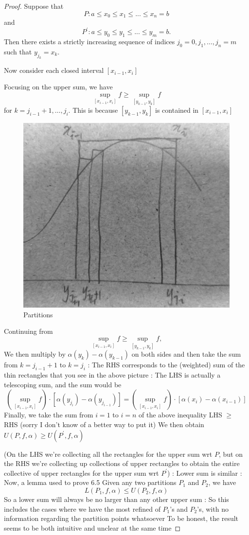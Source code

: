 \begin{proof}
Suppose that
\[ P: a\le x_0\le x_1\le ...\le x_n=b \]
and
\[ P^\prime: a\le y_0\le y_1\le ...\le y_m=b. \]
Then there exists a strictly increasing sequence of indices $j_0=0,j_1,\dots,j_n=m$ such that $y_{j_k}=x_k$.

Now consider each closed interval $[x_{i-1},x_i]$

Focusing on the upper sum, we have
\[ \sup_{[x_{i-1},x_i]} f \ge \sup_{[y_{k-1},y_k]} f \]
for $k=j_{i-1}+1,\dots,j_i$. 
This is because $[y_{k-1},y_k]$ is contained in $[x_{i-1},x_i]$

\begin{figure}[H]
    \centering
    \includegraphics[width=0.5\linewidth]{images/RSintegral-partitions.png}
    \caption{Partitions}
\end{figure}

Continuing from
\[ \sup_{[x_{i-1},x_i]} f \ge \sup_{[y_{k-1},y_k]} f, \]
We then multiply by $\alpha(y_k)-\alpha(y_{k-1})$ on both sides and then take the sum from $k=j_{i-1}+1$ to $k=j_i$
:
The RHS corresponds to the (weighted) sum of the thin rectangles that you see in the above picture
:
The LHS is actually a telescoping sum, and the sum would be
\[ (\sup_{[x_{i-1},x_i]} f) \cdot [\alpha(y_{j_i})-\alpha(y_{j_{i-1}})] = (\sup_{[x_{i-1},x_i]} f) \cdot [\alpha(x_i)-\alpha(x_{i-1})] \]
Finally, we take the sum from $i=1$ to $i=n$ of the above inequality
LHS $\ge$ RHS (sorry I don't know of a better way to put it)
We then obtain $U(P,f,\alpha)\ge U(P^\prime,f,\alpha)$

(On the LHS we're collecting all the rectangles for the upper sum wrt $P$, but on the RHS we're collecting up collections of upper rectangles to obtain the entire collective of upper rectangles for the upper sum wrt $P^\prime$)
:
Lower sum is similar
:
Now, a lemma used to prove 6.5
Given any two partitions $P_1$ and $P_2$, we have
\[ L(P_1,f,\alpha)\le U(P_2,f,\alpha) \]
So a lower sum will always be no larger than any other upper sum
:
So this includes the cases where we have the most refined of $P_1$'s and $P_2$'s, with no information regarding the partition points whatsoever
To be honest, the result seems to be both intuitive and unclear at the same time


\end{proof}
